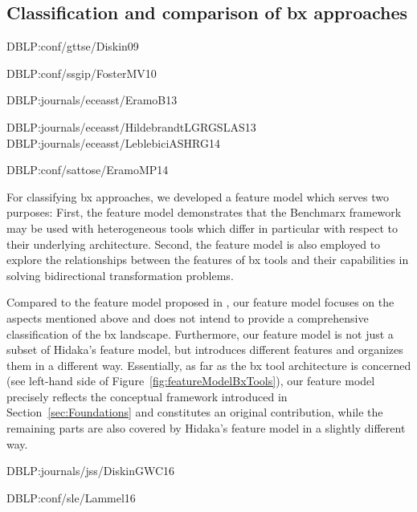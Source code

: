\subsection{Classification and comparison of bx approaches}
\label{sec:ClassificationOfBxApproaches}

DBLP:conf/gttse/Diskin09

DBLP:conf/ssgip/FosterMV10

DBLP:journals/eceasst/EramoB13

DBLP:journals/eceasst/HildebrandtLGRGSLAS13
DBLP:journals/eceasst/LeblebiciASHRG14


DBLP:conf/sattose/EramoMP14

For classifying bx approaches, we developed a feature model which serves two purposes: First, the feature model demonstrates that the Benchmarx framework may be used with heterogeneous tools which differ in particular with respect to their underlying architecture. Second, the feature model is also employed to explore the relationships between the features of bx tools and their capabilities in solving bidirectional transformation problems. 

Compared to the feature model proposed in \cite{SOSYM-Hidaka2016}, our feature model focuses on the aspects mentioned above and does not intend to provide a comprehensive classification of the bx landscape. Furthermore, our feature model is not just a subset of Hidaka's feature model, but introduces different features and organizes them in a different way. Essentially, as far as the bx tool architecture is concerned (see left-hand side of Figure~\ref{fig:featureModelBxTools}), our feature model precisely reflects the conceptual framework introduced in Section~\ref{sec:Foundations} and constitutes an original contribution, while the remaining parts are also covered by Hidaka's feature model in a slightly different way.

DBLP:journals/jss/DiskinGWC16

DBLP:conf/sle/Lammel16

